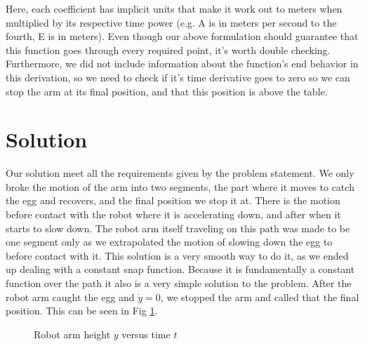 \documentclass[nofoot,pdf-a,balance,colorlinks,upint,subscriptcorrection,varvw,mathalfa=cal=boondoxo]{asmeconf}
\begin{document}
    Here, each coefficient has implicit units that make it work out to meters when multiplied by its respective time power (e.g. A is in meters per second to the fourth, E is in meters). Even though our above formulation should guarantee that this function goes through every required point, it's worth double checking. Furthermore, we did not include information about the function's end behavior in this derivation, so we need to check if it's time derivative goes to zero so we can stop the arm at its final position, and that this position is above the table.



	 
	\section*{Solution}
	
    Our solution meet all the requirements given by the problem statement. We only broke the motion of the arm into two segments, the part where it moves to catch the egg and recovers, and the final position we stop it at. There is the motion before contact with the robot where it is accelerating down, and after when it starts to slow down. The robot arm itself traveling on this path was made to be one segment only as we extrapolated the motion of slowing down the egg to before contact with it. This solution is a very smooth way to do it, as we ended up dealing with a constant snap function. Because it is fundamentally a constant function over the path it also is a very simple solution to the problem. After the robot arm caught the egg and $\dot{y} = 0$, we stopped the arm and called that the final position. This can be seen in Fig \ref{fig1}.\newline

    \begin{figure}[H]
        \caption{Robot arm height $y$ versus time $t$}\label{fig1}
    \end{figure}
	
\end{document}
